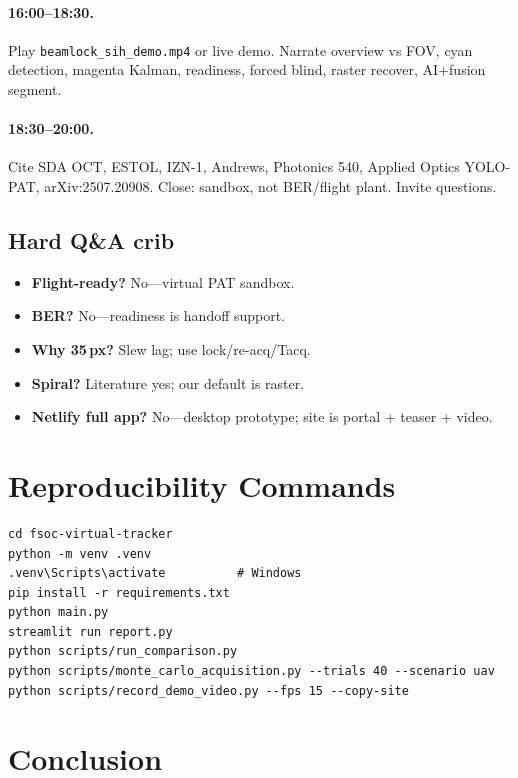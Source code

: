 \documentclass[11pt,a4paper]{article}
\begin{document}
\paragraph{16:00--18:30.}
Play \texttt{beamlock\_sih\_demo.mp4} or live demo.
Narrate overview vs FOV, cyan detection, magenta Kalman, readiness, forced blind, raster recover, AI+fusion segment.

\paragraph{18:30--20:00.}
Cite SDA OCT, ESTOL, IZN-1, Andrews, Photonics 540, Applied Optics YOLO-PAT, arXiv:2507.20908.
Close: sandbox, not BER/flight plant.
Invite questions.

\subsection{Hard Q\&A crib}
\begin{itemize}[leftmargin=1.4em]
  \item \textbf{Flight-ready?} No---virtual PAT sandbox.
  \item \textbf{BER?} No---readiness is handoff support.
  \item \textbf{Why 35\,px?} Slew lag; use lock/re-acq/Tacq.
  \item \textbf{Spiral?} Literature yes; our default is raster.
  \item \textbf{Netlify full app?} No---desktop prototype; site is portal + teaser + video.
\end{itemize}

\section{Reproducibility Commands}

\begin{verbatim}
cd fsoc-virtual-tracker
python -m venv .venv
.venv\Scripts\activate          # Windows
pip install -r requirements.txt
python main.py
streamlit run report.py
python scripts/run_comparison.py
python scripts/monte_carlo_acquisition.py --trials 40 --scenario uav
python scripts/record_demo_video.py --fps 15 --copy-site
\end{verbatim}

\section{Conclusion}
\end{document}
